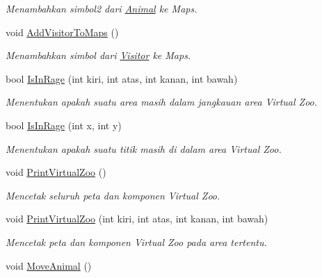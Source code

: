 \begin{DoxyCompactItemize}
\begin{DoxyCompactList}\small\item\em Menambahkan simbol2 dari \hyperlink{classAnimal}{Animal} ke Maps. \end{DoxyCompactList}\item 
\hypertarget{classVirtualZoo_ab4877ea8188676113e800130cf9a1aa8}{void \hyperlink{classVirtualZoo_ab4877ea8188676113e800130cf9a1aa8}{Add\-Visitor\-To\-Maps} ()}\label{classVirtualZoo_ab4877ea8188676113e800130cf9a1aa8}

\begin{DoxyCompactList}\small\item\em Menambahkan simbol dari \hyperlink{classVisitor}{Visitor} ke Maps. \end{DoxyCompactList}\item 
bool \hyperlink{classVirtualZoo_a71fd2fc66e595859f866c7305e124a49}{Is\-In\-Rage} (int kiri, int atas, int kanan, int bawah)
\begin{DoxyCompactList}\small\item\em Menentukan apakah suatu area masih dalam jangkauan area Virtual Zoo. \end{DoxyCompactList}\item 
bool \hyperlink{classVirtualZoo_a48520a102f885c11e2521fb5353c4291}{Is\-In\-Rage} (int x, int y)
\begin{DoxyCompactList}\small\item\em Menentukan apakah suatu titik masih di dalam area Virtual Zoo. \end{DoxyCompactList}\item 
\hypertarget{classVirtualZoo_af3753991af395ddf072fa391f84c7672}{void \hyperlink{classVirtualZoo_af3753991af395ddf072fa391f84c7672}{Print\-Virtual\-Zoo} ()}\label{classVirtualZoo_af3753991af395ddf072fa391f84c7672}

\begin{DoxyCompactList}\small\item\em Mencetak seluruh peta dan komponen Virtual Zoo. \end{DoxyCompactList}\item 
void \hyperlink{classVirtualZoo_ad990878017d48c7d64318f254fb9d85b}{Print\-Virtual\-Zoo} (int kiri, int atas, int kanan, int bawah)
\begin{DoxyCompactList}\small\item\em Mencetak peta dan komponen Virtual Zoo pada area tertentu. \end{DoxyCompactList}\item 
\hypertarget{classVirtualZoo_ab6c6c4297061eea600e265e230489546}{void \hyperlink{classVirtualZoo_ab6c6c4297061eea600e265e230489546}{Move\-Animal} ()}\label{classVirtualZoo_ab6c6c4297061eea600e265e230489546}


\end{DoxyCompactItemize}
